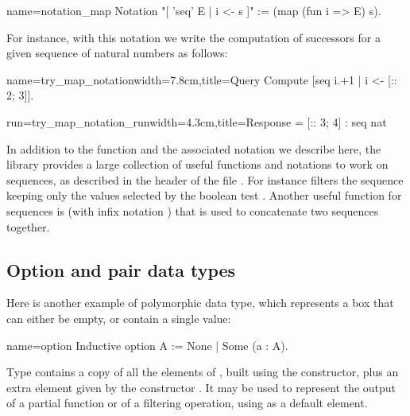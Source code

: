 \begin{coq}{name=notation_map}{}
Notation "[ 'seq' E | i <- s ]" := (map (fun i => E) s).
\end{coq}
For instance, with this notation we write the computation of successors
for a given sequence of natural numbers as follows:

\begin{coq-left}{name=try_map_notation}{width=7.8cm,title=Query}
Compute
  [seq i.+1 | i <- [:: 2; 3]].
\end{coq-left}
\begin{coqout-right}{run=try_map_notation_run}{width=4.3cm,title=Response}
= [:: 3; 4] : seq nat
$~$
\end{coqout-right}
\index[coq]{\C{[seq .. "| .. <- ..]}}
In addition to the function  and the associated notation
we describe here, the \mcbMC{} library
provides a large collection of useful functions and notations to work on
sequences, as described in the header of the file .  For
instance \C{[seq i <- s | p]} filters the sequence  keeping only
the values selected by the boolean test .
Another useful function for sequences is  (with infix notation \C{++})
that is used to concatenate two sequences together.
\index[coq]{\C{(_ ++ _)}}
\index[coq]{\C{[seq .. <- .. "| ..]}}

\subsection{Option and pair data types}\label{sec:othercontainers}

Here is another example of polymorphic data type, which represents a
box that can either be empty, or contain a single value:

\begin{coq}{name=option}{}
Inductive option A := None | Some (a : A).
\end{coq}

Type   contains a
copy of all the elements of ,
built using the  constructor, plus an extra element given by
the constructor . It may be used to represent the output of a
partial function or of a filtering operation, using  as a
default element.


